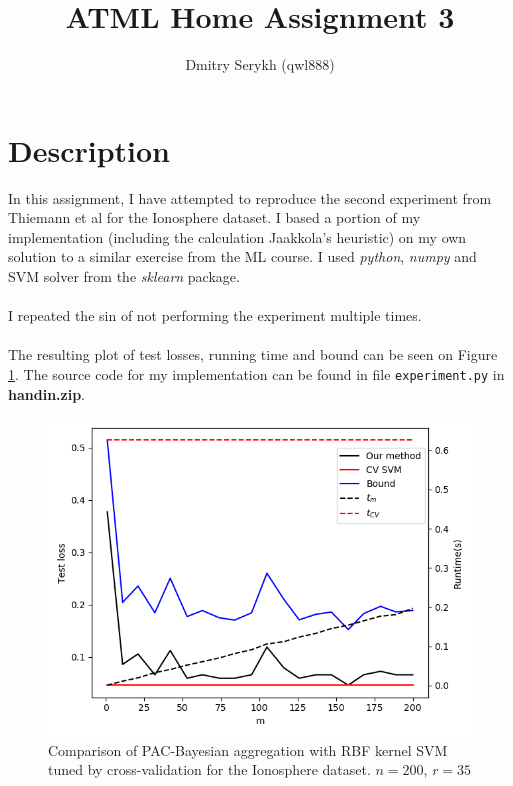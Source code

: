 \documentclass[a4paper]{article}
\title{\vspace{-5cm}ATML Home Assignment 3}
\author{Dmitry Serykh (qwl888)}
\begin{document}
\maketitle
\section{Description}
\label{sec:desc}
In this assignment, I have attempted to reproduce the second experiment from
Thiemann et al for the Ionosphere dataset. I based a portion of my implementation
(including the calculation Jaakkola's heuristic) on my own solution to a similar
exercise from the ML course. I used \emph{python}, \emph{numpy} and SVM solver
from the \emph{sklearn} package. \\\\
I repeated the sin of not performing the experiment multiple times.\\\\
The resulting plot of test losses, running time and bound can be seen
on Figure \ref{plt1}. The source code for my implementation can be found in file
\texttt{experiment.py} in \textbf{handin.zip}.


\begin{figure}
  \centering
  \includegraphics[width=\textwidth]{code/plt1}
  \caption{Comparison of PAC-Bayesian aggregation with RBF kernel SVM
    tuned by cross-validation for the Ionosphere dataset. $n=200$, $r=35$}
  \label{plt1}
\end{figure}
\end{document}
